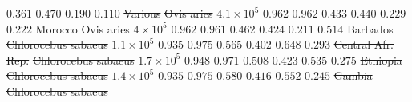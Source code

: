 \documentclass{article} %
\providecommand{\DIFdeltex}[1]{{\protect\color{red}\sout{#1}}}                      %
\providecommand{\DIFdelFL}[1]{\DIFdel{#1}} %
\providecommand{\DIFdel}[1]{\texorpdfstring{\DIFdeltex{#1}}{}} %
\begin{document}
\DIFdelFL{$ 0.361$ }%
\DIFdelFL{$ 0.470$ }%
\DIFdelFL{$ 0.190$ }%
\DIFdelFL{$ 0.110$ }%
\DIFdelFL{Various }%
\DIFdelFL{Ovis aries }%
\DIFdelFL{$4.1\times 10^{5}$ }%
\DIFdelFL{$ 0.962$ }%
\DIFdelFL{$ 0.962$ }%
\DIFdelFL{$ 0.433$ }%
\DIFdelFL{$ 0.440$ }%
\DIFdelFL{$ 0.229$ }%
\DIFdelFL{$ 0.222$ }%
\DIFdelFL{Morocco }%
\DIFdelFL{Ovis aries }%
\DIFdelFL{$ 4\times 10^{5}$ }%
\DIFdelFL{$ 0.962$ }%
\DIFdelFL{$ 0.961$ }%
\DIFdelFL{$ 0.462$ }%
\DIFdelFL{$ 0.424$ }%
\DIFdelFL{$ 0.211$ }%
\DIFdelFL{$ 0.514$ }%
\DIFdelFL{Barbados }%
\DIFdelFL{Chlorocebus sabaeus }%
\DIFdelFL{$1.1\times 10^{5}$ }%
\DIFdelFL{$ 0.935$ }%
\DIFdelFL{$ 0.975$ }%
\DIFdelFL{$ 0.565$ }%
\DIFdelFL{$ 0.402$ }%
\DIFdelFL{$ 0.648$ }%
\DIFdelFL{$ 0.293$ }%
\DIFdelFL{Central Afr. Rep. }%
\DIFdelFL{Chlorocebus sabaeus }%
\DIFdelFL{$1.7\times 10^{5}$ }%
\DIFdelFL{$ 0.948$ }%
\DIFdelFL{$ 0.971$ }%
\DIFdelFL{$ 0.508$ }%
\DIFdelFL{$ 0.423$ }%
\DIFdelFL{$ 0.535$ }%
\DIFdelFL{$ 0.275$ }%
\DIFdelFL{Ethiopia }%
\DIFdelFL{Chlorocebus sabaeus }%
\DIFdelFL{$1.4\times 10^{5}$ }%
\DIFdelFL{$ 0.935$ }%
\DIFdelFL{$ 0.975$ }%
\DIFdelFL{$ 0.580$ }%
\DIFdelFL{$ 0.416$ }%
\DIFdelFL{$ 0.552$ }%
\DIFdelFL{$ 0.245$ }%
\DIFdelFL{Gambia }%
\DIFdelFL{Chlorocebus sabaeus }%
\end{document}
